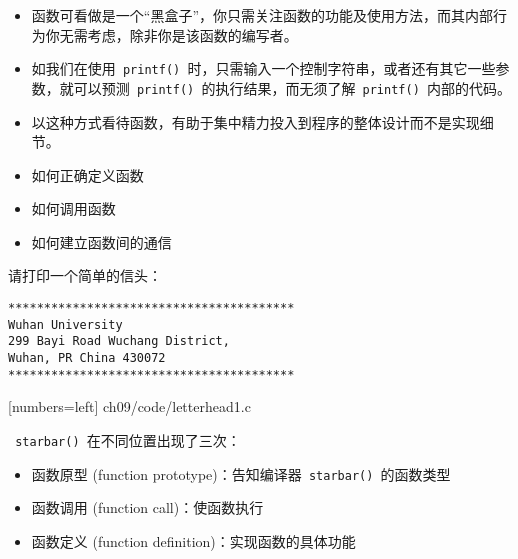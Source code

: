 \begin{frame}[fragile]
\begin{itemize}
\item
函数可看做是一个“黑盒子”，你只需关注函数的功能及使用方法，而其内部行为你无需考虑，除非你是该函数的编写者。\\[0.1in]
\item
如我们在使用\lstinline| printf() |时，只需输入一个控制字符串，或者还有其它一些参数，就可以预测\lstinline| printf() |的执行结果，而无须了解\lstinline| printf() |内部的代码。
\\[0.1in]
\item
以这种方式看待函数，有助于集中精力投入到程序的整体设计而不是实现细节。
\end{itemize}
\end{frame}

\begin{frame}[fragile]
\begin{itemize}
\item 如何正确定义函数\\[0.1in]
\item 如何调用函数\\[0.1in]
\item 如何建立函数间的通信
\end{itemize}

\end{frame}

\begin{frame}[fragile]
请打印一个简单的信头：
\begin{lstlisting}[backgroundcolor=\color{red!10}]
****************************************
Wuhan University
299 Bayi Road Wuchang District,
Wuhan, PR China 430072
****************************************
\end{lstlisting}
\end{frame}

\begin{frame}

[numbers=left]
{ch09/code/letterhead1.c}
\end{frame}


\begin{frame}[fragile]
\lstinline| starbar() |在不同位置出现了三次：\vspace{0.1in}

\begin{itemize}
\item 函数原型{ (function prototype)}：告知编译器\lstinline| starbar() |的函数类型\\[0.1in]
\item 函数调用{ (function call)}：使函数执行\\[0.1in]
\item 函数定义{ (function definition)}：实现函数的具体功能
\end{itemize}
\end{frame}

